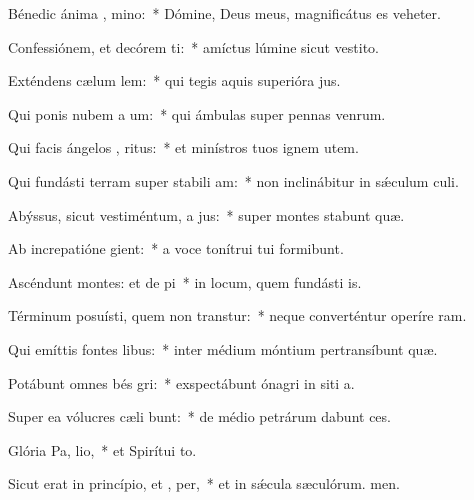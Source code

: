 \item Bénedic ánima , mino:~* Dómine, Deus meus, magnificátus es veheter.
\item Confessiónem, et decórem ti:~* amíctus lúmine sicut vestito.
\item Exténdens cælum  lem:~* qui tegis aquis superióra jus.
\item Qui ponis nubem a um:~* qui ámbulas super pennas venrum.
\item Qui facis ángelos , ritus:~* et minístros tuos ignem utem.
\item Qui fundásti terram super stabili am:~* non inclinábitur in sǽculum culi.
\item Abýssus, sicut vestiméntum, a jus:~* super montes stabunt quæ.
\item Ab increpatióne  gient:~* a voce tonítrui tui formibunt.
\item Ascéndunt montes: et de pi~* in locum, quem fundásti is.
\item Términum posuísti, quem non transtur:~* neque converténtur operíre ram.
\item Qui emíttis fontes  libus:~* inter médium móntium pertransíbunt quæ.
\item Potábunt omnes bés gri:~* exspectábunt ónagri in siti a.
\item Super ea vólucres cæli bunt:~* de médio petrárum dabunt ces.
\item Glória Pa,  lio,~* et Spirítui to.
\item Sicut erat in princípio, et ,  per,~* et in sǽcula sæculórum. men.
